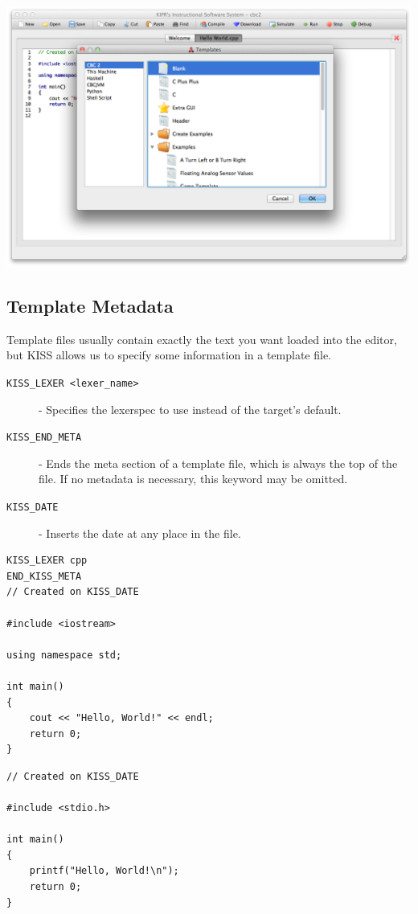 \documentclass[7pt,letterpaper]{article}
\newcommand{\code}[1]{\texttt{#1}}
\begin{document}
	\vspace{.25in}
	\includegraphics[width=1\textwidth]{KISSTemplates.png}
	
	\subsection{Template Metadata}
	Template files usually contain exactly the text you want loaded into the editor, but KISS allows us to specify some information in a template file.
	
	\begin{description}
	\item[\code{KISS\_LEXER <lexer\_name>}] - Specifies the lexerspec to use instead of the target's default.
	\item[\code{KISS\_END\_META}] - Ends the meta section of a template file, which is always the top of the file.
	If no metadata is necessary, this keyword may be omitted.
	\item[\code{KISS\_DATE}] - Inserts the date at any place in the file.
	\end{description}
	\singlespacing
	
	\begin{lstlisting}
KISS_LEXER cpp
END_KISS_META
// Created on KISS_DATE

#include <iostream>

using namespace std;

int main() 
{
	cout << "Hello, World!" << endl;
	return 0;
}
	\end{lstlisting}
	\vspace{.25in}
	
	\begin{lstlisting}
// Created on KISS_DATE

#include <stdio.h>

int main() 
{
	printf("Hello, World!\n");
	return 0;
}
	\end{lstlisting}
	\vspace{.25in}
	
\end{document}
